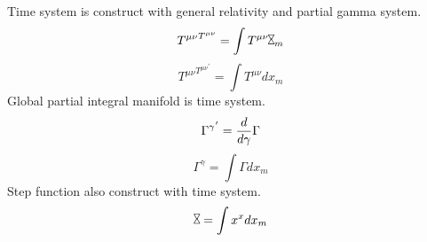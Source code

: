 \documentclass{jsarticle}
\begin{document}
 \newcommand{\whitewithbodercirclevarint}{%
	 \begin{picture}(13,13)
		 \put(0,0){\scalebox{2.0}[2]{$\whitewithbodercircle$}}
		 \put(0,0){\scalebox{2.0}[2]{$\varint$}}
	 \end{picture}%
	 }
 
 \newcommand{\whitewithbodercirclevariiint}{%
	 \begin{picture}(13,13)
		 \put(0,0){\scalebox{2.0}[2]{$\whitewithbodercircle$}}
		 \put(0,0){\scalebox{2.0}[2]{$\variiint$}}
	 \end{picture}%
	 }
 
 \newcommand{\average}{%
	  \begin{picture}(30,45)
		  \put(0,0){\scalebox{2.0}[2]{$\square$}}
		  \put(4,4){$\setminus$}
	  \end{picture}%
  } 
  \newcommand{\smallaverage}{%
	  \begin{picture}(30,45)
		  \put(0,0){\scalebox{1.0}[1]{$\square$}}
		  \put(0,0){$\setminus$}
	  \end{picture}%
  } 
 
  \newcommand{\whitewithboder}{%
	  \begin{picture}(15,30)
		  \put(0,0){\scalebox{2.0}[2]{$\square$}}
		  \put(4,4){$\square$}
	  \end{picture}%
  } 
  \newcommand{\whitewithnabla}{%
	  \begin{picture}(15,30)
		  \put(0,0){\scalebox{2.0}[2]{$\nabla$}}
		  \put(3,3){$\nabla$}
	  \end{picture}%
  } 

   Time system is construct with general relativity and partial gamma system.
   $$ {T^{\mu\nu}}^{T^{\mu\nu}} = \int T^{\mu\nu} \rotatebox{90}{$\bowtie$}_m $$
   $$   {T^{\mu\nu}}^{{T^{\mu\nu}}^{'}}=\int T^{\mu\nu}dx_m  $$
   Global partial integral manifold is time system.
      $$ {\Gamma^{\gamma}}^{'} = {d \over {d \gamma}}\Gamma $$
   $$ \Gamma^{\gamma} = \int \Gamma dx_m $$
   Step function also construct with time system. 
   $$ \rotatebox{90}{$\bowtie$} = \int x^x dx_m $$
\end{document}
